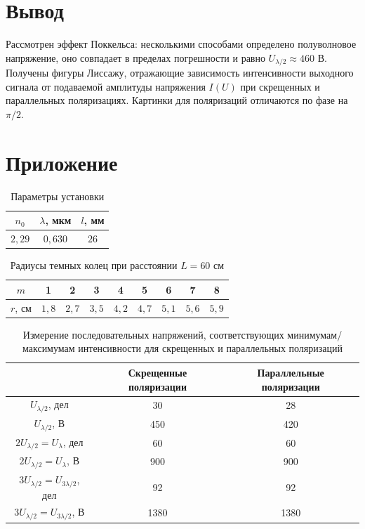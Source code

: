 \documentclass[a4paper]{article}
\begin{document}
\section{Вывод}

Рассмотрен эффект Поккельса: несколькими способами определено полуволновое напряжение, оно совпадает в пределах погрешности и равно $U_{\lambda/2} \approx 460$ В. Получены фигуры Лиссажу, отражающие зависимость интенсивности выходного сигнала от подаваемой амплитуды напряжения $I(U)$ при скрещенных и параллельных поляризациях. Картинки для поляризаций отличаются по фазе на $\pi/2$.

\section{Приложение}

\begin{table}[!ht]
    \centering
    \caption{Параметры установки}
    \begin{tabular}{|c|c|c|}
    \hline
    $n_0$  & $\lambda$, мкм & $l$, мм \\ \hline
    $2,29$ & $0,630$        & $26$    \\ \hline
    \end{tabular}
\end{table}

\begin{table}[!ht]
    \centering
    \caption{Радиусы темных колец при расстоянии $L = 60$ см}
    \begin{tabular}{|c|c|c|c|c|c|c|c|c|}
    \hline
    $m$     & 1     & 2     & 3     & 4     & 5     & 6     & 7     & 8     \\ \hline
    $r$, см & $1,8$ & $2,7$ & $3,5$ & $4,2$ & $4,7$ & $5,1$ & $5,6$ & $5,9$ \\ \hline
    \end{tabular}
\end{table}


\begin{table}[ht!]
    \centering
    \caption{Измерение последовательных напряжений, соответствующих минимумам/максимумам интенсивности для скрещенных и параллельных поляризаций}
    \begin{tabular}{|c|c|c|}
        \hline
        &Скрещенные поляризации&Параллельные поляризации\\
        \hline
        $U_{\lambda/2}$, дел&30&28\\
        \hline
        $U_{\lambda/2}$, В&450&420\\
        \hline
        \hline
        $2U_{\lambda/2} = U_\lambda$, дел&60&60\\
        \hline
        $2U_{\lambda/2} = U_\lambda$, В&900&900\\
        \hline
        \hline
        $3U_{\lambda/2} = U_{3\lambda/2}$, дел&92&92\\
        \hline
        $3U_{\lambda/2} = U_{3\lambda/2}$, В&1380&1380\\
        \hline
    \end{tabular}
\end{table}
\end{document}
